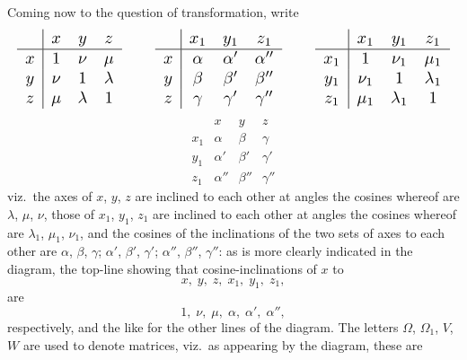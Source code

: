 \documentclass[11pt]{article}
\begin{document}
\bigskip

Coming now to the question of transformation, write
\[
   \resizebox{\textwidth}{!}{$\displaystyle
   \begin{array}{c|ccc}
       & x  & y  & z\\\hline
     x & 1  & \nu & \mu\\
     y & \nu & 1  & \lambda\\
     z & \mu & \lambda & 1
   \end{array}\qquad
   \begin{array}{c|ccc}
        & x_1 & y_1 & z_1\\\hline
     x  & \alpha & \alpha' & \alpha''\\
     y  & \beta  & \beta'  & \beta''\\
     z  & \gamma & \gamma' & \gamma''
   \end{array}\qquad
   \begin{array}{c|ccc}
        & x_1 & y_1 & z_1\\\hline
     x_1 & 1   & \nu_1 & \mu_1\\
     y_1 & \nu_1 & 1   & \lambda_1\\
     z_1 & \mu_1 & \lambda_1 & 1
   \end{array}$}
\]
\[
   \begin{array}{c|ccc}
        & x  & y  & z\\\hline
     x_1 & \alpha & \beta & \gamma\\
     y_1 & \alpha' & \beta' & \gamma'\\
     z_1 & \alpha'' & \beta'' & \gamma''
   \end{array}
\]
viz.\ the axes of $x$, $y$, $z$ are inclined to each other at angles the cosines whereof are
$\lambda$, $\mu$, $\nu$, those of $x_1$, $y_1$, $z_1$ are inclined to each other at angles the cosines whereof
are $\lambda_1$, $\mu_1$, $\nu_1$, and the cosines of the inclinations of the two sets of axes to each
other are $\alpha$, $\beta$, $\gamma$; $\alpha'$, $\beta'$, $\gamma'$; $\alpha''$, $\beta''$, $\gamma''$: as is more clearly indicated in the diagram,
the top-line showing that cosine-inclinations of $x$ to
\[
   x,\; y,\; z,\; x_1,\; y_1,\; z_1,
\]
are
\[
   1,\; \nu,\; \mu,\; \alpha,\; \alpha',\; \alpha'',
\]
respectively, and the like for the other lines of the diagram. The letters $\Omega$, $\Omega_1$, $V$,
$W$ are used to denote matrices, viz.\ as appearing by the diagram, these are
\end{document}
